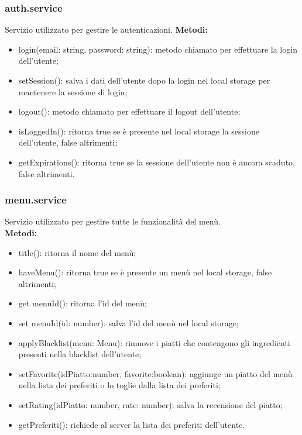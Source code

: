 \subsubsection{auth.service}
Servizio utilizzato per gestire le autenticazioni.
\textbf{Metodi:}
\begin{itemize}
    \item login(email: string, password: string): metodo chiamato per effettuare la login dell'utente;
    \item setSession(): salva i dati dell'utente dopo la login nel local storage per mantenere la sessione di login;
    \item logout(): metodo chiamato per effettuare il logout dell'utente;
    \item isLoggedIn(): ritorna true se è presente nel local storage la sessione dell'utente, false altrimenti;
    \item getExpirations(): ritorna true se la sessione dell'utente non è ancora scaduto, false altrimenti.
\end{itemize}

\subsubsection{menu.service}
Servizio utilizzato per gestire tutte le funzionalità del menù.\\
\textbf{Metodi:}
\begin{itemize}
    \item title(): ritorna il nome del menù;
    \item haveMenu(): ritorna true se è presente un menù nel local storage, false altrimenti;
    \item get menuId(): ritorna l'id del menù;
    \item set menuId(id: number): salva l'id del menù nel local storage;
    \item applyBlacklist(menu: Menu): rimuove i piatti che contengono gli ingredienti presenti nella blacklist dell'utente;
    \item setFavorite(idPiatto:number, favorite:boolean): aggiunge un piatto del menù nella lista dei preferiti o lo toglie dalla lista dei preferiti;
    \item  setRating(idPiatto: number, rate: number): salva la recensione del piatto;
    \item getPreferiti(): richiede al server la lista dei preferiti dell'utente.
\end{itemize}

